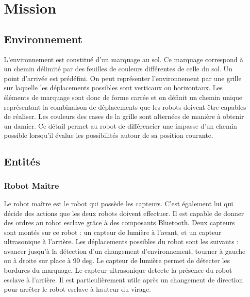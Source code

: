 
 \section{Mission}

  \subsection{Environnement}
  L'environnement est constitu\'{e} d'un marquage au sol. Ce marquage
  correspond \`{a} un chemin d\'{e}limit\'{e} par des feuilles de couleurs
  diff\'{e}rentes de celle du sol. Un point d'arriv\'{e}e est pr\'{e}d\'{e}fini. On peut
  repr\'{e}senter l'environnement par une grille sur laquelle les
  d\'{e}placements possibles sont verticaux ou horizontaux. Les \'{e}l\'{e}ments de
  marquage sont donc de forme carr\'{e}e et on d\'{e}finit un chemin unique
  repr\'{e}sentant la combinaison de d\'{e}placements que les robots doivent
  \^{e}tre capables de r\'{e}aliser. Les couleurs des cases de la grille sont
  altern\'{e}es de mani\`{e}re \`{a} obtenir un damier. Ce d\'{e}tail permet au robot de
  diff\'{e}rencier une impasse d'un chemin possible lorsqu'il \'{e}value les
  possibilit\'{e}s autour de sa position courante.

  \subsection{Entit\'{e}s}

   \subsubsection{Robot Ma\^{i}tre}
   Le robot ma\^{i}tre est le robot qui poss\`{e}de les capteurs. C'est
   \'{e}galement lui qui d\'{e}cide des actions que les deux robots doivent
   effectuer. Il est capable de donner des ordres au robot esclave
   gr\^{a}ce \`{a} des composants Bluetooth. Deux capteurs sont mont\'{e}s sur
   ce robot : un capteur de lumi\`{e}re \`{a} l'avant, et un capteur
   ultrasonique \`{a} l'arri\`{e}re. Les d\'{e}placements possibles du robot sont
   les suivants : avancer jusqu'\`{a} la d\'{e}tection d'un changement
   d'environnement, tourner \`{a} gauche ou \`{a} droite sur place \`{a}
   90 deg. Le
   capteur de lumi\`{e}re permet de d\'{e}tecter les bordures du marquage. Le
   capteur ultrasonique detecte la pr\'{e}sence du robot esclave \`{a}
   l'arri\`{e}re. Il est particuli\`{e}rement utile apr\`{e}s un changement de
   direction pour arr\^{e}ter le robot esclave \`{a} hauteur du virage. 

